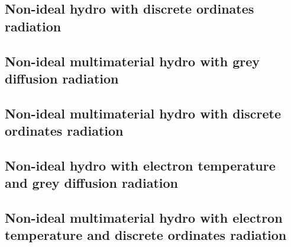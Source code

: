 \documentclass{article}
\begin{document}
   \subsection{Non-ideal hydro with discrete ordinates radiation}

   \subsection{Non-ideal multimaterial hydro with grey diffusion radiation}

   \subsection{Non-ideal multimaterial hydro with discrete ordinates radiation}

   \subsection{Non-ideal hydro with electron temperature and grey diffusion radiation}

   \subsection{Non-ideal multimaterial hydro with electron temperature and discrete ordinates radiation}
\end{document}
